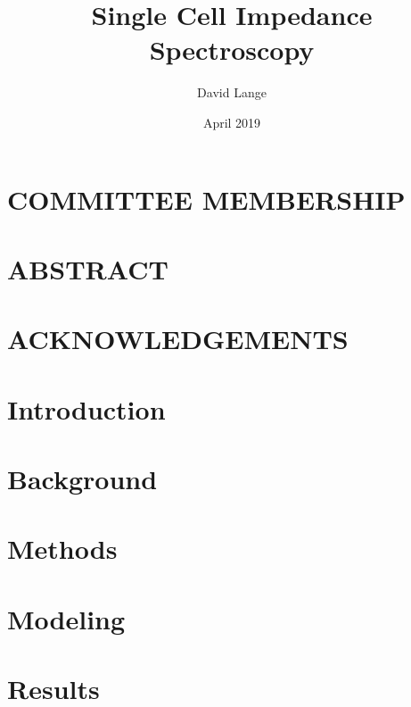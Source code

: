 \documentclass[12pt]{report}
\title{Single Cell Impedance Spectroscopy}
\author{David Lange}
\date{April 2019}
\begin{document}




\chapter*{COMMITTEE MEMBERSHIP}




\chapter*{ABSTRACT}


\chapter*{ACKNOWLEDGEMENTS}


\tableofcontents

\listoffigures

\listoftables

\doublespacing

%
\newpage
{}





\chapter{Introduction}


\chapter{Background}


\chapter{Methods}


\chapter{Modeling}


\chapter{Results}

\end{document}
